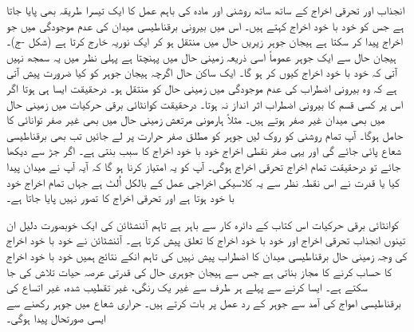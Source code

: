 انجذاب اور تحرقی اخراج کے ساتھ ساتھ روشنی اور مادہ کی باہم عمل کا ایک تیسرا طریقہ بھی پایا جاتا ہے جس کو خود با خود اخراج کہتے ہیں۔ اس میں بیرونی برقناطیسی میدان کی عدم موجودگی میں جو اخراج پیدا کر سکتا ہے ہیجان جوہر زیریں حال میں منتقل ہو کر ایک نوریہ خارج کرتا ہے  (شکل -ج)۔ 	ہیجان حال سے ایک جوہر عموماً اسی ذریعہ زمینی حال میں پہنچتا ہے پہلی نظر میں یہ سمجھ نہیں آتی کہ خود با خود اخراج کیوں کر ہو گا۔ ایک ساکن حال اگرچہ ہیجان جوہر کو کیا ضرورت پیش آتی ہے کہ وہ بیرونی اضطراب کی عدم موجودگی میں زمینی حال کو منتقل ہو۔ درحقیقت ایسا ہی ہوتا اگر اس پر کسی قسم کا بیرونی اضطراب اثر انداز نہ ہوتا۔ درحقیقت کوانٹائی برقی حرکیات میں زمینی حال میں بھی میدان غیر صفر ہوتے ہیں۔ مثلاً ہارمونی مرتعش زمینی حال میں بھی غیر صفر توانائی  کا حامل ہوگا۔ آپ تمام روشنی کو روک لیں جوہر کو مطلق صفر حرارت پر لے جائیں تب بھی برقناطیسی شعاع پائی جائے گی اور یہی صفر نقطی اخراج خود با خود اخراج کا سبب بنتی ہے۔ اگر جڑ سے دیکھا جائے تو درحقیقت تمام اخراج تحرقی اخراج ہوگی۔ آپ کو یہ امتیاز کرنا ہو گا کہ آیہ آپ نے میدان پیدا کیا یا قدرت نے اس نقطہ نظر سے یہ کلاسیکی اخراجی عمل کے بالکل اُلٹ ہے جہاں تمام اخراج خود با خود ہوتا ہے اور تحرقی اخراج کا تصور نہیں پایا جاتا ہے۔

کوانٹائی برقی حرکیات اس کتاب کے دائرہ کار سے باہر ہے تاہم آئنشٹائن کی ایک خوبصورت دلیل ان تینوں انجذاب تحرقی اخراج اور خود با خود اخراج کا تعلق پیش کرتا ہے۔ آئنشٹائن نے خود با خود اخراج کی وجہ زمینی حال برقناطیسی میدان کا اضطراب پیش نہیں کی تاہم انکے نتائج ہمیں خود با خود اخراج کا حساب کرنے کا مجاز بناتی ہے جس سے ہیجان جوہری حال کی قدرتی عرصہ حیات تلاش کی جا سکتے ہے۔ ایسا کرنے سے پہلے ہر طرف سے غیر یک رنگی، غیر تقطیب شدہ، غیر اتساع کی برقناطیسی امواج کی آمد سے جوہر کے رد عمل پر بات کرتے ہیں۔ حراری شعاع میں جوہر رکھنے سے ایسی صورتحال پیدا ہوگی۔

